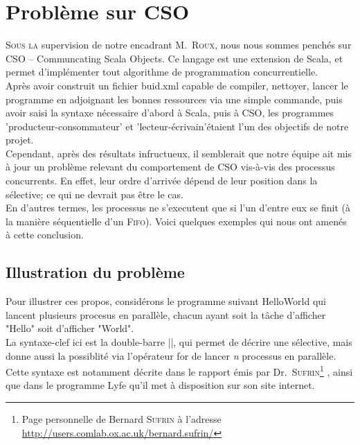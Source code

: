 \documentclass[a4paper,11pt,french]{report}
\begin{document}
\section{Problème sur CSO}

\lettrine{S}{ous la} supervision de notre encadrant M.\ \textsc{Roux}, nous nous sommes penchés sur CSO -- Communcating Scala Objects. Ce langage est une extension de Scala, et permet d'implémenter tout algorithme de programmation concurrentielle.\\

Après avoir construit un fichier \textsf{buid.xml} capable de compiler, nettoyer, lancer le programme en adjoignant les bonnes ressources via une simple commande, puis avoir saisi la syntaxe nécessaire d'abord à Scala, puis à CSO, les programmes 'producteur-consommateur' et 'lecteur-écrivain'étaient l'un des objectifs de notre projet.\\

Cependant, après des résultats infructueux, il semblerait que notre équipe ait mis à jour un problème relevant du comportement de CSO vis-à-vis des processus concurrents. En effet, leur ordre d'arrivée dépend de leur position dans la sélective; ce qui ne devrait pas être le cas.\\ 

En d'autres termes, les processus ne s'executent que si l'un d'entre eux se finit (à la manière séquentielle d'un \textsc{Fifo}). Voici quelques exemples qui nous ont amenés à cette conclusion.

\subsection{Illustration du problème}

Pour illustrer ces propos, considérons le programme suivant \textsf{HelloWorld} qui lancent plusieurs procesus en parallèle, chacun ayant soit la tâche d'afficher "Hello" soit d'afficher "World".\\
La syntaxe-clef ici est la double-barre ||, qui permet de décrire une sélective, mais donne aussi la possiblité via l'opérateur \textsf{for} de lancer \textit{n} processus en parallèle.\\
Cette syntaxe est notamment décrite dans le rapport émis par Dr.\ \textsc{Sufrin}\footnote{Page personnelle de Bernard \textsc{Sufrin} à l'adresse \url{http://users.comlab.ox.ac.uk/bernard.sufrin/}} \cite{cpa2008-cso}, ainsi que dans le programme Lyfe qu'il met à disposition sur son site internet.
\medskip
\end{document}
